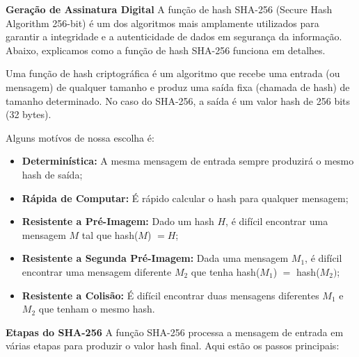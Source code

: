 \documentclass[a4paper,12pt]{article}
\begin{document}
\textbf*{Geração de Assinatura Digital}
A função de hash SHA-256 (Secure Hash Algorithm 256-bit) é um dos algoritmos mais amplamente utilizados para garantir a integridade e a autenticidade de dados em segurança da informação. Abaixo, explicamos como a função de hash SHA-256 funciona em detalhes.

Uma função de hash criptográfica é um algoritmo que recebe uma entrada (ou mensagem) de qualquer tamanho e produz uma saída fixa (chamada de hash) de tamanho determinado. No caso do SHA-256, a saída é um valor hash de 256 bits (32 bytes).

Alguns motívos de nossa escolha é:
\begin{itemize}
    \item \textbf{Determinística:} A mesma mensagem de entrada sempre produzirá o mesmo hash de saída;
    \item \textbf{Rápida de Computar:} É rápido calcular o hash para qualquer mensagem;
    \item \textbf{Resistente a Pré-Imagem:} Dado um hash \(H\), é difícil encontrar uma mensagem \(M\) tal que hash(\(M\)) \(= H\);
    \item \textbf{Resistente a Segunda Pré-Imagem:} Dada uma mensagem \(M_{1}\), é difícil encontrar uma mensagem diferente \(M_{2}\) que tenha hash(\(M_{1}\)) \(=\) hash(\(M_{2})\);
    \item \textbf{Resistente a Colisão:} É difícil encontrar duas mensagens diferentes \(M_{1}\) e \(M_{2}\) que tenham o mesmo hash.
\end{itemize}

\textbf*{Etapas do SHA-256}
A função SHA-256 processa a mensagem de entrada em várias etapas para produzir o valor hash final. Aqui estão os passos principais:
\end{document}
